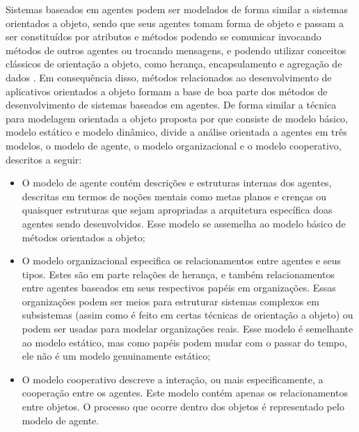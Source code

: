 Sistemas baseados em agentes podem ser modelados de forma similar a sistemas orientados a objeto, sendo que seus agentes tomam forma de objeto e passam a ser constituídos por atributos e métodos podendo se comunicar invocando métodos de outros agentes ou trocando mensagens, e podendo utilizar conceitos clássicos de orientação a objeto, como herança, encapsulamento e agregação de dados \cite{intelligent}. Em consequência disso, métodos relacionados ao desenvolvimento de aplicativos orientados a objeto formam a base de boa parte dos métodos de desenvolvimento de sistemas baseados em agentes. De forma similar a técnica para modelagem orientada a objeto proposta por  que consiste de modelo básico, modelo estático e modelo dinâmico,  divide a análise orientada a agentes em três modelos, o modelo de agente, o modelo organizacional e o modelo cooperativo, descritos a seguir:

\begin{itemize}
  \item O modelo de agente contém descrições e estruturas internas dos agentes, descritas em termos de noções mentais como metas planos e crenças ou quaisquer estruturas que sejam apropriadas a arquitetura específica doas agentes sendo desenvolvidos. Esse modelo se assemelha ao modelo básico de métodos orientados a objeto;
  \item O modelo organizacional especifica os relacionamentos entre agentes e seus tipos. Estes são em parte relações de herança, e também relacionamentos entre agentes baseados em seus respectivos papéis em organizações. Essas organizações podem ser meios para estruturar sistemas complexos em subsistemas (assim como é feito em certas técnicas de orientação a objeto) ou podem ser usadas para modelar organizações reais. Esse modelo é semelhante ao modelo estático, mas como papéis podem mudar com o passar do tempo, ele não é um modelo genuinamente estático;
  \item O modelo cooperativo descreve a interação, ou mais especificamente, a cooperação entre os agentes. Este modelo contém apenas os  relacionamentos entre objetos. O processo que ocorre dentro dos objetos é representado pelo modelo de agente.
\end{itemize}
